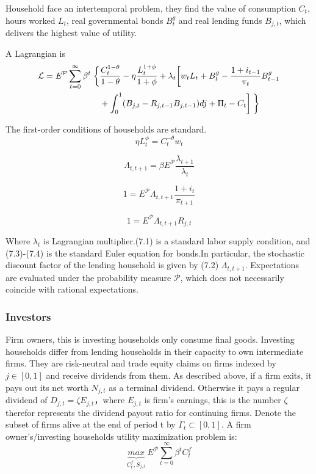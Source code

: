 \documentclass[cn,10pt,math=newtx,citestyle=gb7714-2015,bibstyle=gb7714-2015]{elegantbook}
\begin{document}
{{	
	Household face an intertemporal problem, they find the value of consumption $C_t$, hours worked $L_t$,  real governmental bonds $B_{t}^g$ and real lending funds $B_{j,t}$, which delivers the highest value of utility. 
	
	A Lagrangian is
	\begin{equation*}
		\begin{aligned}
			\mathcal{L}=\mathit{E}^{\mathcal{P}} \sum_{t=0}^{\infty}\beta^t\biggm\{&\frac{C_{t}^{1-\theta}}{1-\theta}-\eta \frac{L_{t}^{1+\phi}}{1+\phi}+\lambda_t\bigg[w_tL_t+B_t^g-\frac{1+i_{t-1}}{\pi_t}B_{t-1}^g\\
			&+\int_0^1(B_{j,t}-R_{j,t-1}B_{j,t-1})dj+\Pi_t-C_t\bigg]\biggm\}
		\end{aligned}
	\end{equation*}
	
	
	The first-order conditions of households are standard. 
	\begin{equation}
		\eta L_t^{\phi}=C_t^{-\theta}w_t
	\end{equation}
	
	\begin{equation}
		\Lambda_{t,t+1}=\beta\mathit{E}^{\mathcal{P}}\frac{\lambda_{t+1}}{\lambda_t}
	\end{equation}
	
	\begin{equation}
		1=\mathit{E}^{\mathcal{P}}\Lambda_{t,t+1}\frac{1+i_t}{\pi_{t+1}}
	\end{equation}
	
	\begin{equation}
		1=\mathit{E}^{\mathcal{P}}\Lambda_{t,t+1}R_{j,t}
	\end{equation}
	
	Where $\lambda_t$ is Lagrangian multiplier.(7.1) is a standard labor supply condition, and (7.3)-(7.4) is the standard Euler equation for bonds.In particular, the stochastic discount factor of the lending household is given by (7.2) $\Lambda_{t,t+1}$. Expectations are evaluated under the probability measure $\mathcal{P}$, which does not necessarily coincide with rational expectations.
	
	\subsubsection{Investors}
	Firm owners, this is investing households only consume final goods. Investing households differ from lending households in their capacity to own intermediate firms. They are risk-neutral and trade equity claims on firms indexed by $j \in [0, 1]$ and receive dividends from them. As described above, if a firm exits, it pays out its net worth $N_{j,t}$ as a terminal dividend. Otherwise it pays a regular dividend of $D_{j,t}=\zeta E_{j,t}$，where $E_{j,t}$ is firm's earnings, this is the number $\zeta$ therefor represents the dividend payout ratio for continuing firms. Denote the subset of firms alive at the end of period t by $\varGamma_t \subset [0, 1]$. A firm owner’s/investing households utility maximization problem is:
	\begin{equation*}
		\underbrace{max}_{C_t^f,S_{j,t}}~\mathit{E}^{\mathcal{P}} \sum_{t=0}^{\infty}\beta^tC_{t}^f
	\end{equation*}
	
}}
\end{document}
